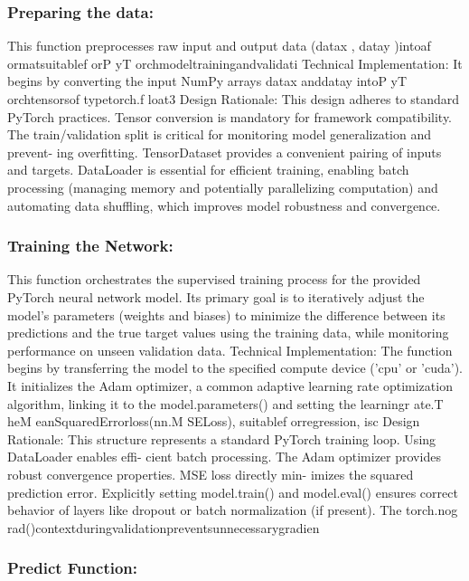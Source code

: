 \documentclass{article}
\begin{document}
{\subsubsection{Preparing the data:}

This function preprocesses raw input and output data (datax , datay )intoaf ormatsuitablef orP yT orchmodeltrainingandvalidati
Technical Implementation: It begins by converting the input NumPy arrays datax anddatay intoP yT orchtensorsof typetorch.f loat3
Design Rationale: This design adheres to standard PyTorch practices. Tensor conversion is mandatory for
framework compatibility. The train/validation split is critical for monitoring model generalization and prevent-
ing overfitting. TensorDataset provides a convenient pairing of inputs and targets. DataLoader is essential for
efficient training, enabling batch processing (managing memory and potentially parallelizing computation) and
automating data shuffling, which improves model robustness and convergence.\\

\subsubsection{Training the Network:}

This function orchestrates the supervised training process for the provided PyTorch neural network model. Its
primary goal is to iteratively adjust the model’s parameters (weights and biases) to minimize the difference
between its predictions and the true target values using the training data, while monitoring performance on
unseen validation data.
Technical Implementation: The function begins by transferring the model to the specified compute device (’cpu’
or ’cuda’). It initializes the Adam optimizer, a common adaptive learning rate optimization algorithm, linking it
to the model.parameters() and setting the learningr ate.T heM eanSquaredErrorloss(nn.M SELoss), suitablef orregression, isc
Design Rationale: This structure represents a standard PyTorch training loop. Using DataLoader enables effi-
cient batch processing. The Adam optimizer provides robust convergence properties. MSE loss directly min-
imizes the squared prediction error. Explicitly setting model.train() and model.eval() ensures correct behavior of
layers like dropout or batch normalization (if present). The torch.nog rad()contextduringvalidationpreventsunnecessarygradien\\


\subsubsection{Predict Function:}

}
\end{document}
